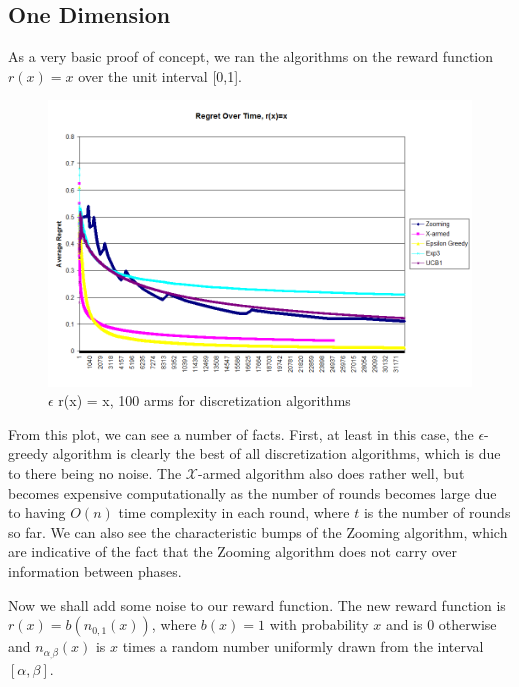 \subsection{One Dimension}
As a very basic proof of concept, we ran the algorithms on the reward
function $r(x) = x$ over the unit interval [0,1].

\begin{figure}[h!]
  \begin{center}
    \includegraphics[width=\figwidth]{figures/1dsimpleplot.png}
     \caption{$\epsilon$ r(x) = x, 100 arms for discretization
     algorithms}
     \label{fig:1dsimple}
  \end{center}
\end{figure}

From this plot, we can see a number of facts.  First, at 
least in this case, the $\epsilon$-greedy algorithm is clearly the
best of all discretization algorithms, which is due to there being
no noise.  The $\mathcal{X}$-armed algorithm also does rather well,
but becomes expensive computationally as the number of rounds becomes
large due to having $O(n)$ time complexity in each round, where $t$ is
the number of rounds so far.  We can also see the characteristic bumps of
the Zooming algorithm, which are indicative of the fact that the Zooming
algorithm does not carry over information between phases.

Now we shall add some noise to our reward function.  The new reward
function is $r(x) = b(n_{0,1}(x))$, where $b(x) = 1$ with probability
$x$ and is 0 otherwise and $n_{\alpha_,\beta}(x)$ is $x$ times a random
number uniformly drawn from the interval $[\alpha, \beta]$.